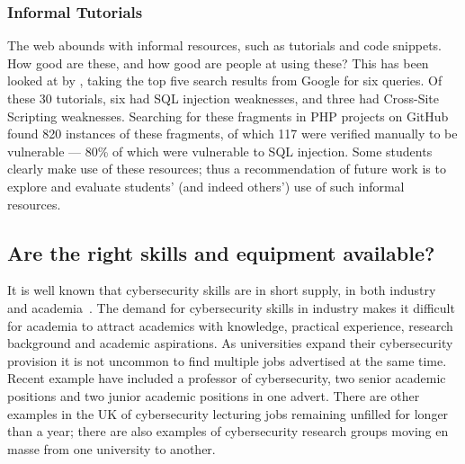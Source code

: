 \documentclass[sigconf]{acmart}
\begin{document}
\subsubsection{Informal Tutorials}  %
\begin{comment}
took out foot notes for space
The web abounds with informal resources, such as tutorials as well as code snippets. How good are these, and how good are people at using these? This has been looked at by \cite{Unruhetal2017a}, taking the top five search results from Google for six queries. Of these 30 tutorials, six had SQL injection weaknesses, and three had Cross-Site Scripting\footnote{Number 7 in OWASP's Top Ten \cite{OWASP2017a}.} weaknesses. Searching for these fragments in PHP projects on GitHub found 820 instances of these fragments, of which 117 were verified manually to be vulnerable --- 80\% of which were vulnerable to SQL injection. Some students clearly make use of these resources; thus a recommendation of future work is to explore and evaluate students' (and indeed others') use of such informal resources. 
\end{comment}

The web abounds with informal resources, such as tutorials and code snippets. How good are these, and how good are people at using these? This has been looked at by \cite{Unruhetal2017a}, taking the top five search results from Google for six queries. Of these 30 tutorials, six had SQL injection weaknesses, and three had Cross-Site Scripting weaknesses. Searching for these fragments in PHP projects on GitHub found 820 instances of these fragments, of which 117 were verified manually to be vulnerable --- 80\% of which were vulnerable to SQL injection. Some students clearly make use of these resources; thus a recommendation of future work is to explore and evaluate students' (and indeed others') use of such informal resources. 

\subsection{Are the right skills and equipment available?}
It is well known that cybersecurity skills are in short supply, in both industry~\cite{Ackerman2019a} and academia~\cite{schneider2013}. The demand for cybersecurity skills in industry makes it difficult for academia to attract academics with knowledge, practical experience, research background and academic aspirations. As universities expand their cybersecurity provision it is not uncommon to find multiple jobs advertised at the same time. Recent example have included a professor of cybersecurity, two senior academic positions and two junior academic positions in one advert. There are other examples in the UK of cybersecurity lecturing jobs remaining unfilled for longer than a year; there are also examples of cybersecurity research groups moving en masse from one university to another.
\end{document}
